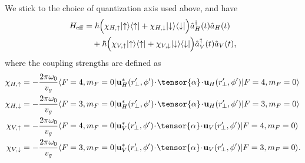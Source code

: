 \documentclass[preprint,aps,pra,onecolumn]{revtex4-1} %
\begin{document}
We stick to the choice of quantization axis used above, and have
\begin{align}
H_{\rm eff} & =  \hbar \Big( \chi_{H,\uparrow}\lvert{\uparrow}\rangle\langle{\uparrow}\rvert +  
\chi_{H,\downarrow} \lvert{\downarrow}\rangle\langle{\downarrow}\rvert \Big) \hat{a}_H^\dagger(t) \hat{a}_H(t) \nonumber\\
&\quad +  \hbar  \Big( \chi_{V,\uparrow}\lvert{\uparrow}\rangle\langle{\uparrow}\rvert +  \chi_{V,\downarrow} 
\lvert{\downarrow}\rangle\langle{\downarrow}\rvert \Big) \hat{a}_V^\dagger(t) \hat{a}_V(t)  ,
\end{align}
where the coupling strengths are defined as
\begin{align}
\chi_{H,\uparrow} &=  -\frac{2\pi\omega_0}{v_g} \bra{F=4,m_F=0} 
\mathbf{u}^*_{H}(r^\prime\!\!_\perp,\phi') \!\cdot\!\tensor{\alpha}\!\cdot\! 
\mathbf{u}_{H}(r^\prime\!\!_\perp,\phi') \ket{F=4,m_F=0}\\
\chi_{H,\downarrow} &=  -\frac{2\pi\omega_0}{v_g}  \bra{F=3,m_F=0} 
\mathbf{u}^*_{H}(r^\prime\!\!_\perp,\phi') \!\cdot\!\tensor{\alpha}\!\cdot\! 
\mathbf{u}_{H}(r^\prime\!\!_\perp,\phi') \ket{F=3,m_F=0} \\
\chi_{V,\uparrow} &=  -\frac{2\pi\omega_0}{v_g}   \bra{F=4,m_F=0} 
\mathbf{u}^*_{V}(r^\prime\!\!_\perp,\phi') \!\cdot\!\tensor{\alpha}\!\cdot\! 
\mathbf{u}_{V}(r^\prime\!\!_\perp,\phi') \ket{F=4,m_F=0}  \\
\chi_{V,\downarrow} &=  -\frac{2\pi\omega_0}{v_g}  \bra{F=3,m_F=0} 
\mathbf{u}^*_{V}(r^\prime\!\!_\perp,\phi') \!\cdot\!\tensor{\alpha}\!\cdot\! 
\mathbf{u}_{V}(r^\prime\!\!_\perp,\phi') \ket{F=3,m_F=0}. 
\end{align}
\end{document}

